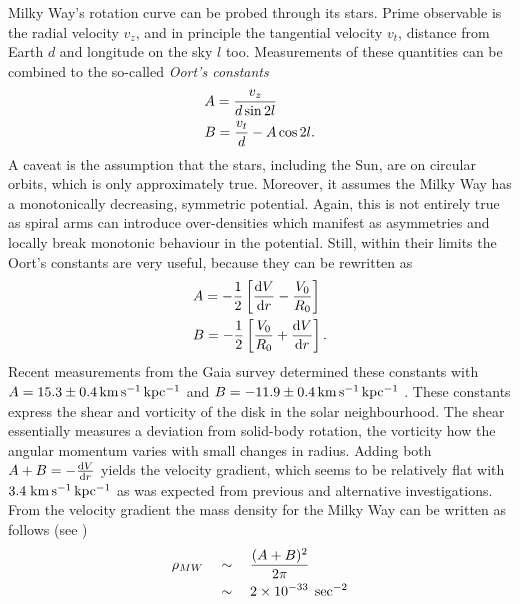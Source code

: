 Milky Way's rotation curve can be probed through its stars. Prime observable is
the radial velocity $v_{z}$, and in principle the tangential velocity $v_{t}$,
distance from Earth $d$ and longitude on the sky $l$ too.  Measurements of these
quantities can be combined to the so-called \textit{Oort's constants}
%
\begin{equation}\eqlbl{obs_oortsC}%
    \begin{aligned}%
        &A = \frac{v_{z}}{d\sin{2l}} \\
        &B = \frac{v_{t}}{d} - A\cos{2l}.
    \end{aligned}%
\end{equation}%
%
A caveat is the assumption that the stars, including the Sun, are on circular
orbits, which is only approximately true.  Moreover, it assumes the Milky Way
has a monotonically decreasing, symmetric potential.  Again, this is not
entirely true as spiral arms can introduce over-densities which manifest as
asymmetries and locally break monotonic behaviour in the potential.  Still,
within their limits the Oort's constants are very useful, because they can be
rewritten as
%
\begin{equation}\eqlbl{oortsC}
    \begin{aligned}%
        &A = -\frac{1}{2} \left[\frac{\derivd V}{\derivd r} - \frac{V_{0}}{R_{0}}\right] \\
        &B = -\frac{1}{2}\left[\frac{V_{0}}{R_{0}} + \frac{\derivd V}{\derivd r}\right].
    \end{aligned}%
\end{equation}
%
Recent measurements from the Gaia survey determined these constants with
$A=15.3\pm0.4\,\mathrm{km\,s^{-1}\,kpc^{-1}}$ and $B=-11.9\pm0.4\,\mathrm{km\,s^{-1}\,kpc^{-1}}$
.  These constants express the shear and vorticity of the disk
in the solar neighbourhood.  The shear essentially measures a deviation from
solid-body rotation, the vorticity how the angular momentum varies with small
changes in radius.  Adding both $A+B = -\frac{\mathrm{d} V}{\mathrm{d} r}$ yields the
velocity gradient, which seems to be relatively flat with $3.4\;\mathrm{km\,s^{-1}\,kpc^{-1}}$
as was expected from previous and alternative investigations.  From the velocity
gradient the mass density for the Milky Way can be written as follows (see
)
%
\begin{equation}\eqlbl{MWrho}
    \begin{aligned}
        \rho_{MW} &\quad\sim\quad \frac{(A+B)^2}{2\pi} \\
                  &\quad\sim\quad 2 \times 10^{-33}\;\sec^{-2}
    \end{aligned}
\end{equation}
